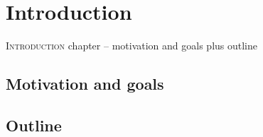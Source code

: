 \chapter{Introduction}
\label{chap:introduction}

\lettrine{I}{ntroduction} chapter -- motivation and goals plus outline

\pagebreak

\section{Motivation and goals}
\label{sec:motivation_and_goals}

\section{Outline}
\label{sec:outline}

